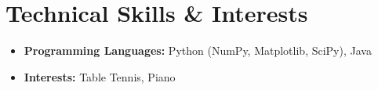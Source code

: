 \documentclass[letterpaper,11pt]{article}
\newcommand{\resumeSubHeadingListStart}{\begin{itemize}[leftmargin=0.15in, label={}]}
\newcommand{\resumeSubHeadingListEnd}{\end{itemize}}
\begin{document}
\section{Technical Skills \& Interests}
    \resumeSubHeadingListStart
        \item \textbf{Programming Languages:} Python (NumPy, Matplotlib, SciPy), Java \vspace{-7.5pt}
        \item \textbf{Interests:} Table Tennis, Piano \vspace{-7.5pt}
    \resumeSubHeadingListEnd

\end{document}
